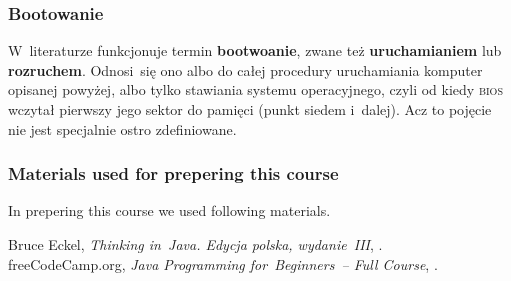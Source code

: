 \documentclass[10pt,t]{beamer}
\begin{document}
\begin{frame}
  \frametitle{Bootowanie}


  W~literaturze funkcjonuje termin \textbf{bootwoanie}, zwane też
  \textbf{uruchamianiem} lub \textbf{rozruchem}. Odnosi~się ono albo do
  całej procedury uruchamiania komputer opisanej powyżej, albo tylko
  stawiania systemu operacyjnego, czyli od kiedy \textsc{bios} wczytał
  pierwszy jego sektor do pamięci (punkt siedem i~dalej). Acz to pojęcie
  nie jest specjalnie ostro zdefiniowane.

\end{frame}





\begin{frame}
  \frametitle{Materials used for prepering this course}


  In prepering this course we used following materials.

  Bruce Eckel, \textit{Thinking in~Java. Edycja polska, wydanie~III},
  \parencite{Eckel-Thinking-in-Java-Ed-polska-Wyd-III-Pub-2003}. \\
  freeCodeCamp.org, \textit{Java Programming for~Beginners~-- Full Course},
  \parencite{freeCodeCamp-org-Java-Programming-for-Beginners-ETC-Ver-2022}.
  \\


\end{frame}










\appendix











\printbibliography










\end{document}
